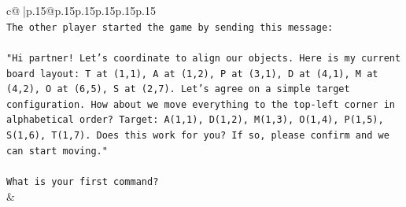 \documentclass{article}
\begin{document}
{\begin{supertabular}{c@{$\;$}|p{.15\linewidth}@{}p{.15\linewidth}p{.15\linewidth}p{.15\linewidth}p{.15\linewidth}p{.15\linewidth}}
{{{\\ 
\texttt{The other player started the game by sending this message:} \\
\\ 
\texttt{"Hi partner! Let's coordinate to align our objects. Here is my current board layout: T at (1,1), A at (1,2), P at (3,1), D at (4,1), M at (4,2), O at (6,5), S at (2,7). Let's agree on a simple target configuration. How about we move everything to the top{-}left corner in alphabetical order? Target: A(1,1), D(1,2), M(1,3), O(1,4), P(1,5), S(1,6), T(1,7). Does this work for you? If so, please confirm and we can start moving."} \\
\\ 
\texttt{What is your first command?} \\
            }
        }
    }
    & \\ \\


\end{supertabular}}
\end{document}
